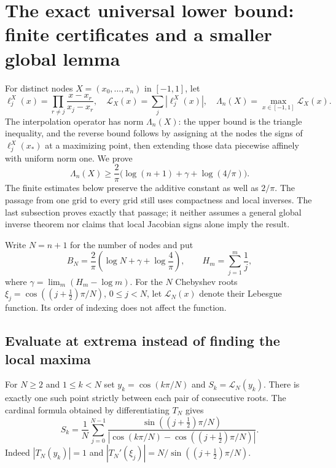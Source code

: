\documentclass[11pt]{article}
\theoremstyle{remark}\newtheorem{remark}[theorem]{Remark}
\begin{document}
\section{The exact universal lower bound: finite certificates and a smaller global lemma}
\label{sec:universal}
For distinct nodes $X=(x_0,\ldots,x_n)$ in $[-1,1]$, let
\[
 \ell_j^X(x)=\prod_{r\ne j}\frac{x-x_r}{x_j-x_r},\quad
 \mathcal L_X(x)=\sum_j|\ell_j^X(x)|,\quad
 \Lambda_n(X)=\max_{x\in[-1,1]}\mathcal L_X(x).
\]
The interpolation operator has norm $\Lambda_n(X)$: the upper bound is the
triangle inequality, and the reverse bound follows by assigning at the
nodes the signs of $\ell_j^X(x_*)$ at a maximizing point, then extending
those data piecewise affinely with uniform norm one.
We prove
\[
 \Lambda_n(X)\ge\frac2\pi\bigl(\log(n+1)+\gamma+\log(4/\pi)\bigr).
\]
The finite estimates below preserve the additive constant as well as
$2/\pi$. The passage from one grid to every grid still uses compactness
and local inverses. The last subsection proves exactly that passage;
it neither assumes a general global inverse theorem nor claims that
local Jacobian signs alone imply the result.

Write $N=n+1$ for the number of nodes and put
\[
 B_N=\frac2\pi\left(\log N+\gamma+\log\frac4\pi\right),
 \qquad H_m=\sum_{j=1}^{m}\frac1j,
\]
where $\gamma=\lim_m(H_m-\log m)$.
For the $N$ Chebyshev roots
$\xi_j=\cos((j+\tfrac12)\pi/N)$, $0\le j<N$, let
$\mathcal L_N(x)$ denote their Lebesgue function.  Its order of indexing
does not affect the function.

\subsection{Evaluate at extrema instead of finding the local maxima}
\label{polyretry:cotangent-samples}

For $N\ge2$ and $1\le k<N$ set $y_k=\cos(k\pi/N)$ and
$S_k=\mathcal L_N(y_k)$.  There is exactly one such point strictly
between each pair of consecutive roots.  The cardinal formula obtained
by differentiating $T_N$ gives
\begin{equation}\label{polyretry:sample}
 S_k=\frac1N\sum_{j=0}^{N-1}
 \frac{\sin((j+\tfrac12)\pi/N)}
 {|\cos(k\pi/N)-\cos((j+\tfrac12)\pi/N)|}.
\end{equation}
Indeed $|T_N(y_k)|=1$ and
$|T_N'(\xi_j)|=N/\sin((j+\tfrac12)\pi/N)$.
\end{document}
